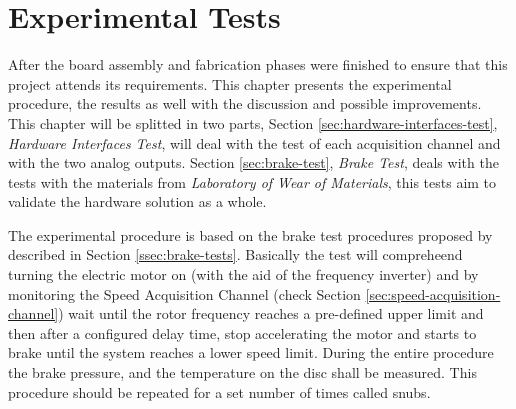 \chapter{Experimental Tests}\label{ch:experimentalTests}
		After the board assembly and fabrication phases were finished to ensure that this project attends its requirements. This chapter presents the experimental procedure, the results as well with the discussion and possible improvements. This chapter will be splitted in two parts, Section \ref{sec:hardware-interfaces-test}, \textit{Hardware Interfaces Test}, will deal with the test of each acquisition channel and with the two analog outputs. Section \ref{sec:brake-test}, \textit{Brake Test}, deals with the tests with the materials from \textit{Laboratory of Wear of Materials}, this tests aim to validate the hardware solution as a whole.
		\par
		The experimental procedure is based on the brake test procedures proposed by \cite{saej2522} described in Section \ref{ssec:brake-tests}. Basically the test will compreheend turning the electric motor on (with the aid of the frequency inverter) and by monitoring the Speed Acquisition Channel (check Section \ref{sec:speed-acquisition-channel}) wait until the rotor frequency reaches a pre-defined upper limit and then after a configured delay time, stop accelerating the motor and starts to brake until the system reaches a lower speed limit. During the entire procedure the brake pressure, and the temperature on the disc shall be measured. This procedure should be repeated for a set number of times called snubs. 

		
		